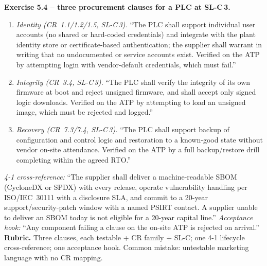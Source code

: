 \documentclass[11pt,a4paper]{article}
\begin{document}
\begin{solutionbox}
\textbf{Exercise 5.4 -- three procurement clauses for a PLC at SL-C\,3.}
\begin{enumerate}\setlength{\itemsep}{1pt}
  \item \emph{Identity (CR~1.1/1.2/1.5, SL-C\,3).} ``The PLC shall support individual user accounts (no shared or hard-coded credentials) and integrate with the plant identity store or certificate-based authentication; the supplier shall warrant in writing that no undocumented or service accounts exist. Verified on the ATP by attempting login with vendor-default credentials, which must fail.''
  \item \emph{Integrity (CR~3.4, SL-C\,3).} ``The PLC shall verify the integrity of its own firmware at boot and reject unsigned firmware, and shall accept only signed logic downloads. Verified on the ATP by attempting to load an unsigned image, which must be rejected and logged.''
  \item \emph{Recovery (CR~7.3/7.4, SL-C\,3).} ``The PLC shall support backup of configuration and control logic and restoration to a known-good state without vendor on-site attendance. Verified on the ATP by a full backup/restore drill completing within the agreed RTO.''
\end{enumerate}
\emph{4-1 cross-reference:} ``The supplier shall deliver a machine-readable SBOM (CycloneDX or SPDX) with every release, operate vulnerability handling per ISO/IEC~30111 with a disclosure SLA, and commit to a 20-year support/security-patch window with a named PSIRT contact. A supplier unable to deliver an SBOM today is not eligible for a 20-year capital line.'' \emph{Acceptance hook:} ``Any component failing a clause on the on-site ATP is rejected on arrival.'' \textbf{Rubric.} Three clauses, each testable + CR family + SL-C; one 4-1 lifecycle cross-reference; one acceptance hook. Common mistake: untestable marketing language with no CR mapping.
\end{solutionbox}
\end{document}
